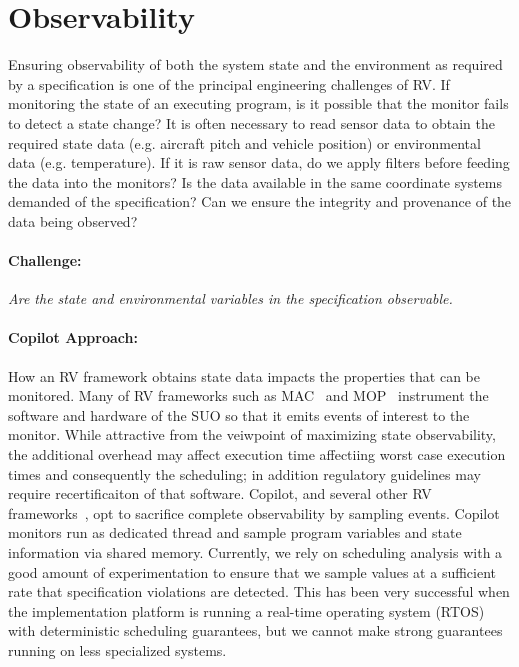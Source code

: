 \section{Observability}\label{sec:observ} 

 Ensuring observability of
both the system state and the environment as required by a
specification is one of the principal engineering challenges of RV.
If monitoring the state of an executing program, is it possible that
the monitor fails to detect a state change?  It is often necessary to
read sensor data to obtain the required state data (e.g. aircraft
pitch and vehicle position) or environmental data (e.g. temperature).
If it is raw sensor data, do we apply filters before feeding the data
into the monitors?  Is the data available in the same coordinate
systems demanded of the specification?  Can we ensure the integrity
and provenance of the data being observed?

\paragraph{Challenge:} \emph{Are the state and environmental variables in the
specification  observable.}  


 
  \paragraph{Copilot Approach:}
  How an RV framework obtains state data impacts the properties that
  can be monitored.  Many of RV frameworks such as MAC~\cite{KimLKS04}
  and MOP~\cite{ChenR05} instrument the software and hardware of the
  SUO so that it emits events of interest to the monitor.  While
  attractive from the veiwpoint of maximizing state observability, the
  additional overhead may affect execution time affectiing worst case
  execution times and consequently the scheduling; in addition
  regulatory guidelines may require recertificaiton of that software.
  Copilot, and several other RV
  frameworks~\cite{sampling,Kane15,borzoo}, opt to sacrifice complete
  observability by sampling events.  Copilot monitors run as dedicated
  thread and sample program variables and state information via shared
  memory.  Currently, we rely on scheduling analysis with a good
  amount of experimentation to ensure that we sample values at a
  sufficient rate that specification violations are detected. This has
  been very successful when the implementation platform is running a
  real-time operating system (RTOS) with deterministic scheduling
  guarantees, but we cannot make strong guarantees running on less
  specialized systems.

